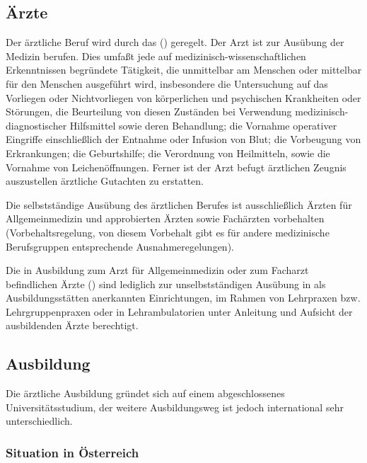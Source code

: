 \documentclass[
ngerman,
paper=a4,
asymmetric,
fontsize=10pt,
draft=false,
numbers=noenddot,
bibtotocnumbered,
footnotes=multiple,
]{scrreprt}
\newcommand{\jALT}{\vspace{6pt}\noindent{\color{red}\sffamily\textbf{DELETED}\hrulefill\newline}}
\begin{document}
\subsection{Ärzte}
\jALT
Der ärztliche Beruf wird durch das  () geregelt.
 Der Arzt ist zur Ausübung der Medizin berufen. Dies umfaßt
 jede auf medizinisch-wissenschaftlichen Erkenntnissen
 begründete Tätigkeit, die unmittelbar am Menschen oder
mittelbar für den Menschen ausgeführt wird, insbesondere 
die Untersuchung auf das Vorliegen oder Nichtvorliegen von körperlichen und psychischen Krankheiten oder Störungen,
die Beurteilung von diesen Zuständen bei Verwendung medizinisch-diagnostischer Hilfsmittel sowie deren Behandlung;
 die Vornahme operativer Eingriffe einschließlich der Entnahme oder Infusion von Blut;
 die Vorbeugung von Erkrankungen;
 die Geburtshilfe;
 die Verordnung von Heilmitteln, sowie
 die Vornahme von Leichenöffnungen.
 Ferner ist
der Arzt befugt ärztlichen Zeugnis auszustellen ärztliche
Gutachten zu erstatten.

Die selbstständige Ausübung des ärztlichen Berufes
ist ausschließlich Ärzten für Allgemeinmedizin und
approbierten Ärzten sowie Fachärzten vorbehalten
(Vorbehaltsregelung, von diesem Vorbehalt gibt es
für andere medizinische Berufsgruppen
entsprechende Ausnahmeregelungen).

Die in Ausbildung zum Arzt für Allgemeinmedizin oder zum
Facharzt befindlichen Ärzte () sind lediglich zur
unselbstständigen Ausübung  in  als
Ausbildungsstätten anerkannten Einrichtungen, im Rahmen von
Lehrpraxen bzw. Lehrgruppenpraxen oder in Lehrambulatorien
unter Anleitung und Aufsicht der ausbildenden Ärzte
berechtigt.
 
\subsection{Ausbildung}

Die ärztliche Ausbildung gründet sich auf einem
 abgeschlossenes Universitätsstudium, der weitere
 Ausbildungsweg ist jedoch international sehr
unterschiedlich.
 
\subsubsection{Situation in Österreich}
 
\end{document}
